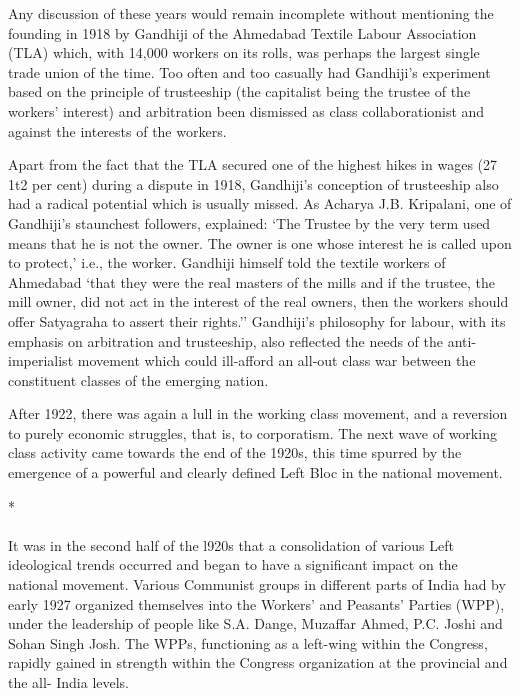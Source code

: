Any discussion of these years would remain incomplete without mentioning the founding in 1918 by Gandhiji of the Ahmedabad Textile Labour Association (TLA) which, with 14,000 workers on its rolls, was perhaps the largest single trade union of the time. Too often and too casually had Gandhiji's experiment based on the principle of trusteeship (the capitalist being the trustee of the workers' interest) and arbitration been dismissed as class collaborationist and against the interests of the workers.

Apart from the fact that the TLA secured one of the highest hikes in wages (27 1t2 per cent) during a dispute in 1918, Gandhiji's conception of trusteeship also had a radical potential which is usually missed. As Acharya J.B. Kripalani, one of Gandhiji's staunchest followers, explained: `The Trustee by the very term used means that he is not the owner. The owner is one whose interest he is called upon to protect,' i.e., the worker. Gandhiji himself told the textile workers of Ahmedabad `that they were the real masters of the mills and if the trustee, the mill owner, did not act in the interest of the real owners, then the workers should offer Satyagraha to assert their rights.'' Gandhiji's philosophy for labour, with its emphasis on arbitration and trusteeship, also reflected the needs of the anti- imperialist movement which could ill-afford an all-out class war between the constituent classes of the emerging nation.

After 1922, there was again a lull in the working class movement, and a reversion to purely economic struggles, that is, to corporatism. The next wave of working class activity came towards the end of the 1920s, this time spurred by the emergence of a powerful and clearly defined Left Bloc in the national movement.

\begin{center}*\end{center}

\paragraph*{}

It was in the second half of the l920s that a consolidation of various Left ideological trends occurred and began to have a significant impact on the national movement. Various Communist groups in different parts of India had by early 1927 organized themselves into the Workers' and Peasants' Parties (WPP), under the leadership of people like S.A. Dange, Muzaffar Ahmed, P.C. Joshi and Sohan Singh Josh. The WPPs, functioning as a left-wing within the Congress, rapidly gained in strength within the Congress organization at the provincial and the all- India levels.

